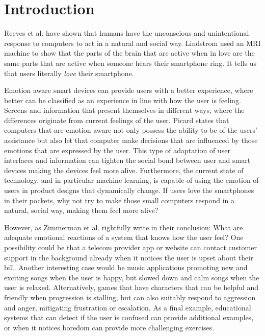 \documentclass{sigchi}
\begin{document}
\section{Introduction} %
\label{sec:introduction}

Reeves et al. \cite{Reeves1998} have shown that humans have the unconscious and unintentional response to computers to act in a natural and social way. Lindstrom \cite{Lindstrom2011} used an MRI machine to show that the parts of the brain that are active when in love are the same parts that are active when someone hears their smartphone ring. It tells us that users literally \textit{love} their smartphone. 

Emotion aware smart devices can provide users with a better experience, where better can be classified as an experience in line with how the user is feeling. Screens and information that present themselves in different ways, where the differences originate from current feelings of the user. Picard \cite{Picard1995} states that computers that are emotion aware not only possess the ability to be of the users' assistance but also let that computer make decisions that are influenced by those emotions that are expressed by the user. This type of adaptation of user interfaces and information can tighten the social bond between user and smart devices making the devices feel more alive. Furthermore, the current state of technology, and in particular machine learning, is capable of using the emotion of users in product designs that dynamically change. If users love the smartphones in their pockets, why not try to make those small computers respond in a natural, social way, making them feel more alive?

However, as Zimmerman et al. \cite{Zimmermann2003} rightfully write in their conclusion: What are adequate emotional reactions of a system that knows how the user feel? One possibility could be that a telecom provider app or website can contact customer support in the background already when it notices the user is upset about their bill. Another interesting case would be music applications promoting new and exciting songs when the user is happy, but slowed down and calm songs when the user is relaxed. Alternatively, games that have characters that can be helpful and friendly when progression is stalling, but can also suitably respond to aggression and anger, mitigating frustration or escalation. As a final example, educational systems that can detect if the user is confused can provide additional examples, or when it notices boredom can provide more challenging exercises.
\end{document}
